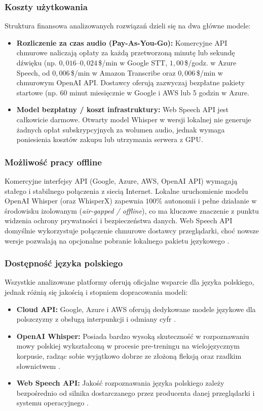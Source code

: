 \subsubsection{Koszty użytkowania}
Struktura finansowa analizowanych rozwiązań dzieli się na dwa główne modele:
\begin{itemize}
    \item \textbf{Rozliczenie za czas audio (Pay-As-You-Go):} Komercyjne API chmurowe naliczają opłaty za każdą przetworzoną minutę lub sekundę dźwięku (np. $0{,}016$--$0{,}024$\,\$/min w Google STT, $1{,}00$\,\$/godz. w Azure Speech, od $0{,}006$\,\$/min w Amazon Transcribe oraz $0{,}006$\,\$/min w chmurowym OpenAI API. Dostawcy oferują zazwyczaj bezpłatne pakiety startowe (np. 60 minut miesięcznie w Google i AWS lub 5 godzin w Azure.
    \item \textbf{Model bezpłatny / koszt infrastruktury:} Web Speech API jest całkowicie darmowe. Otwarty model Whisper w wersji lokalnej nie generuje żadnych opłat subskrypcyjnych za wolumen audio, jednak wymaga poniesienia kosztów zakupu lub utrzymania serwera z GPU.
\end{itemize}

\subsubsection{Możliwość pracy offline}
Komercyjne interfejsy API (Google, Azure, AWS, OpenAI API) wymagają stałego i stabilnego połączenia z siecią Internet. Lokalne uruchomienie modelu OpenAI Whisper (oraz WhisperX) zapewnia $100\%$ autonomii i pełne działanie w środowisku izolowanym (\textit{air-gapped / offline}), co ma kluczowe znaczenie z punktu widzenia ochrony prywatności i bezpieczeństwa danych. Web Speech API domyślnie wykorzystuje połączenie chmurowe dostawcy przeglądarki, choć nowsze wersje pozwalają na opcjonalne pobranie lokalnego pakietu językowego \cite{mdnWebSpeechAPI}.

\subsubsection{Dostępność języka polskiego}
Wszystkie analizowane platformy oferują oficjalne wsparcie dla języka polskiego, jednak różnią się jakością i stopniem dopracowania modeli:
\begin{itemize}
    \item \textbf{Cloud API:} Google, Azure i AWS oferują dedykowane modele językowe dla polszczyzny z obsługą interpunkcji i odmiany cyfr \cite[s.~314--318]{chlewicki2024potencjal}.
    \item \textbf{OpenAI Whisper:} Posiada bardzo wysoką skuteczność w rozpoznawaniu mowy polskiej wykształconą w procesie pre-treningu na wielojęzycznym korpusie, radząc sobie wyjątkowo dobrze ze złożoną fleksją oraz rzadkim słownictwem \cite[s.~23]{radford2023robust}.
    \item \textbf{Web Speech API:} Jakość rozpoznawania języka polskiego zależy bezpośrednio od silnika dostarczanego przez producenta danej przeglądarki i systemu operacyjnego \cite{mdnWebSpeechAPI}.
\end{itemize}

